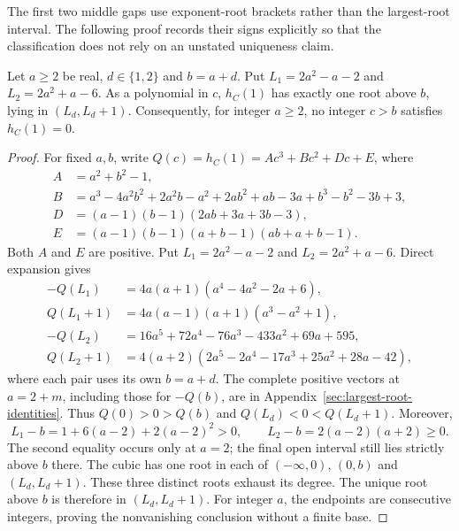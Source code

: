 The first two middle gaps use exponent-root brackets rather than the
largest-root interval. The following proof records their signs explicitly
so that the classification does not rely on an unstated uniqueness claim.

\begin{lemma}
\label{lem:endpoint-one-small-gaps}
Let $a\geq2$ be real, $d\in\{1,2\}$ and $b=a+d$. Put
$L_1=2a^2-a-2$ and $L_2=2a^2+a-6$. As a polynomial in $c$,
$h_C(1)$ has exactly one root above $b$, lying in $(L_d,L_d+1)$.
Consequently, for integer $a\geq2$, no integer $c>b$ satisfies $h_C(1)=0$.
\end{lemma}
\begin{proof}
For fixed $a,b$, write $Q(c)=h_C(1)=A c^3+B c^2+D c+E$, where
\begin{align*}
 A&=a^2+b^2-1,\\
 B&=a^3-4a^2b^2+2a^2b-a^2+2ab^2+ab-3a+b^3-b^2-3b+3,\\
 D&=(a-1)(b-1)(2ab+3a+3b-3),\\
 E&=(a-1)(b-1)(a+b-1)(ab+a+b-1).
\end{align*}
Both $A$ and $E$ are positive. Put $L_1=2a^2-a-2$ and
$L_2=2a^2+a-6$. Direct expansion gives
\begin{align*}
 -Q(L_1)&=4a(a+1)(a^4-4a^2-2a+6),\\
 Q(L_1+1)&=4a(a-1)(a+1)(a^3-a^2+1),\\
 -Q(L_2)&=16a^5+72a^4-76a^3-433a^2+69a+595,\\
 Q(L_2+1)&=4(a+2)(2a^5-2a^4-17a^3+25a^2+28a-42),
\end{align*}
where each pair uses its own $b=a+d$. The complete positive vectors
at $a=2+m$, including those for $-Q(b)$, are in
Appendix~\ref{sec:largest-root-identities}. Thus $Q(0)>0>Q(b)$ and
$Q(L_d)<0<Q(L_d+1)$. Moreover,
\[
 L_1-b=1+6(a-2)+2(a-2)^2>0,\qquad
 L_2-b=2(a-2)(a+2)\geq0.
\]
The second equality occurs only at $a=2$; the final open interval
still lies strictly above $b$ there.
The cubic has one root in each of $(-\infty,0)$, $(0,b)$ and
$(L_d,L_d+1)$. These three distinct roots exhaust its degree.
The unique root above $b$ is therefore in $(L_d,L_d+1)$.
For integer $a$, the endpoints are consecutive integers, proving the
nonvanishing conclusion without a finite base.
\end{proof}


